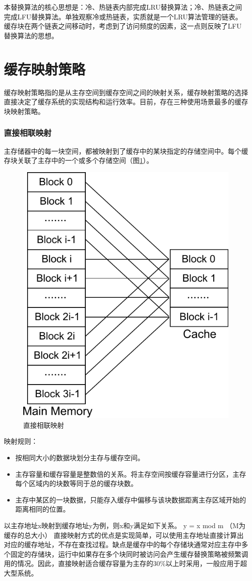 本替换算法的核心思想是：冷、热链表内部完成LRU替换算法；冷、热链表之间完成LFU替换算法。单独观察冷或热链表，实质就是一个LRU算法管理的链表。缓存块在两个链表之间移动时，考虑到了访问频度的因素，这一点则反映了LFU替换算法的思想。

\section{缓存映射策略}
\label{sec:cache_mapping}

缓存映射策略指的是从主存空间到缓存空间之间的映射关系，缓存映射策略的选择直接决定了缓存系统的实现结构和运行效率。目前，存在三种使用场景最多的缓存块映射策略\cite{cachemap2013}。

\subsubsection{直接相联映射}

主存储器中的每一块空间，都被映射到了缓存中的某块指定的存储空间中。每个缓存块关联了主存中的一个或多个存储空间（图\ref{fig:cache-map-1}）。

\begin{figure}[!htb]
\centering
\includegraphics[width=0.4\linewidth]{./graph/cache-map-1}
\caption{直接相联映射}
\label{fig:cache-map-1}
\end{figure}

映射规则：
\begin{itemize}
\item 按相同大小的数据块划分主存与缓存空间。
\item 主存容量和缓存容量是整数倍的关系。将主存空间按缓存容量进行分区，主存每个区域内的块数等同于总的缓存块数。 
\item 主存中某区的一块数据，只能存入缓存中偏移与该块数据距离主存区域开始的距离相同的位置。
\end{itemize}

以主存地址x映射到缓存地址y为例，则x和y满足如下关系。
y = x mod m	（M为缓存的总大小）
直接映射方式的优点是实现简单，可以使用主存地址直接计算出对应的缓存地址，不存在查找过程。缺点是缓存中的每个存储块通常对应主存中多个固定的存储块，运行中如果存在多个块同时被访问会产生缓存替换策略被频繁调用的情况。因此，直接映射适合缓存容量为主存的30\%以上时采用，一般应用于超大型系统。

